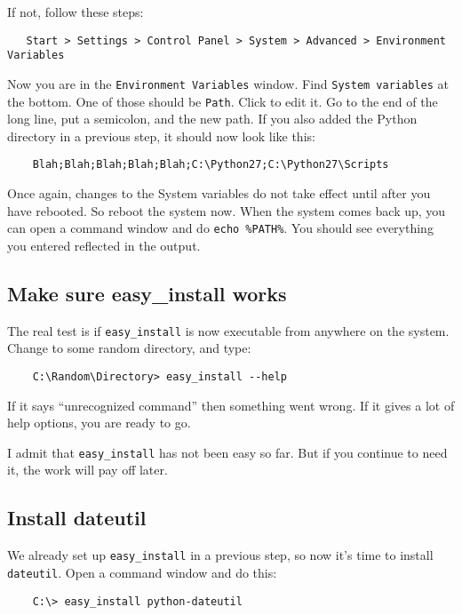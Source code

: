 If not, follow these steps:

\begin{verbatim}
   Start > Settings > Control Panel > System > Advanced > Environment Variables
\end{verbatim}

Now you are in the \verb=Environment Variables= window. Find
\verb=System variables= at the bottom. One of those should be
\verb=Path=. Click to edit it. Go to the end of the long line, put a
semicolon, and the new path. If you also added the Python directory in
a previous step, it should now look like this:

\begin{verbatim}
    Blah;Blah;Blah;Blah;Blah;C:\Python27;C:\Python27\Scripts
\end{verbatim}

Once again, changes to the System variables do not take effect until
after you have rebooted. So reboot the system now. When the system
comes back up, you can open a command window and do \verb=echo %PATH%=.
You should see everything you entered reflected in the output.

\subsection{Make sure easy\_install works}

The real test is if \verb=easy_install= is now executable from anywhere on
the system. Change to some random directory, and type:

\begin{verbatim}
    C:\Random\Directory> easy_install --help
\end{verbatim}

If it says ``unrecognized command'' then something went wrong. If it gives
a lot of help options, you are ready to go.

I admit that \verb=easy_install= has not been easy so far. But if you continue
to need it, the work will pay off later.


\subsection{Install dateutil}

We already set up \verb=easy_install= in a previous step, so now
it's time to install \verb=dateutil=. Open a command window and do this:

\begin{verbatim}
    C:\> easy_install python-dateutil
\end{verbatim}

